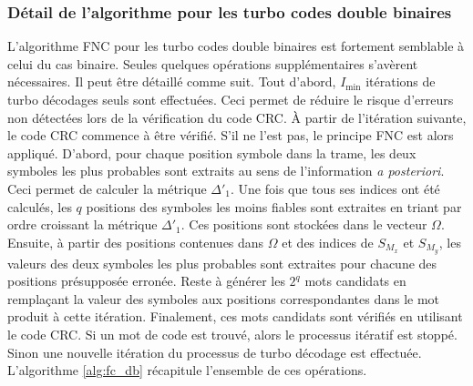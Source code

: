 \subsubsection{Détail de l'algorithme pour les turbo codes double binaires}
L'algorithme FNC pour les turbo codes double binaires est fortement semblable à celui du cas binaire. Seules quelques 
opérations supplémentaires s'avèrent nécessaires. Il peut être détaillé comme suit. Tout d'abord, $I_{\text{min}}$ itérations de 
turbo décodages seuls sont effectuées. Ceci permet de réduire le risque d'erreurs non détectées lors de la vérification 
du code CRC. À partir de l'itération suivante, le code CRC commence à être vérifié. S'il ne l'est pas, le principe FNC
est alors appliqué. D'abord, pour chaque position symbole dans la trame, les deux symboles les plus probables sont 
extraits au sens de l'information \textit{a posteriori}. Ceci permet de calculer la métrique $\Delta'_1$. Une fois que 
tous ses indices ont été calculés, les $q$ positions des symboles les moins fiables sont extraites en triant par ordre 
croissant la métrique $\Delta'_1$. Ces positions sont stockées dans le vecteur $\Omega$. Ensuite, à partir des positions contenues dans
$\Omega$ et des indices de $S_{M_x}$ et $S_{M_y}$, les valeurs des deux symboles les plus probables sont extraites pour 
chacune des positions présupposée erronée. Reste à générer les $2^q$ mots candidats en remplaçant la valeur des symboles
aux positions correspondantes dans le mot produit à cette itération. Finalement, ces mots candidats sont vérifiés
en utilisant le code CRC. Si un mot de code est trouvé, alors le processus itératif est stoppé. Sinon une nouvelle itération
du processus de turbo décodage est effectuée. L'algorithme \ref{alg:fc_db} récapitule l'ensemble de ces opérations.

